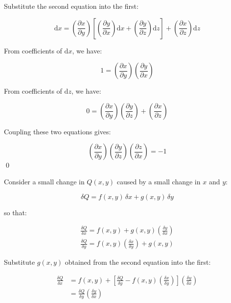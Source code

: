 \documentclass[12pt]{article}
\begin{document}
Substitute the second equation into the first:

\begin{equation}
    \mathrm{d}x = \left( \frac{\partial x}{\partial y} \right) \left[ \left( \frac{\partial y}{\partial x} \right) \mathrm{d}x + \left( \frac{\partial y}{\partial z} \right) \mathrm{d}z \right] + \left( \frac{\partial x}{\partial z} \right) \mathrm{d}z
\end{equation}

From coefficients of $\mathrm{d}x$, we have:

\begin{equation}
    1 = \left( \frac{\partial x}{\partial y} \right) \left( \frac{\partial y}{\partial x} \right)
\end{equation}

From coefficients of $\mathrm{d}z$, we have:

\begin{equation}
    0 = \left( \frac{\partial x}{\partial y} \right) \left( \frac{\partial y}{\partial z} \right) + \left( \frac{\partial x}{\partial z} \right)
\end{equation}

Coupling these two equations gives:

\begin{equation}
    \left( \frac{\partial x}{\partial y} \right) \left( \frac{\partial y}{\partial z} \right) \left( \frac{\partial z}{\partial x} \right) = -1
\end{equation}
\qed


Consider a small change in $Q(x, y)$ caused by a small change in $x$ and $y$:

\begin{equation}
    \delta Q = f(x, y) \, \delta x + g(x, y) \, \delta y
\end{equation}

so that:

\begin{equation}
\begin{split}
    \frac{\delta Q}{\delta x} = f(x, y) + g(x, y) \left( \frac{\delta y}{\delta x} \right) \\
    \frac{\delta Q}{\delta y} = f(x, y) \left( \frac{\delta x}{\delta y} \right) + g(x, y)
\end{split}
\end{equation}

Substitute $g(x, y)$ obtained from the second equation into the first:

\begin{equation}
\begin{split}
    \frac{\delta Q}{\delta x} &= f(x, y) + \left[ \frac{\delta Q}{\delta y} - f(x, y) \left( \frac{\delta x}{\delta y} \right) \right] \left( \frac{\delta y}{\delta x} \right) \\
    &= \frac{\delta Q}{\delta y} \left( \frac{\delta y}{\delta x} \right)
\end{split}
\end{equation}
\end{document}
